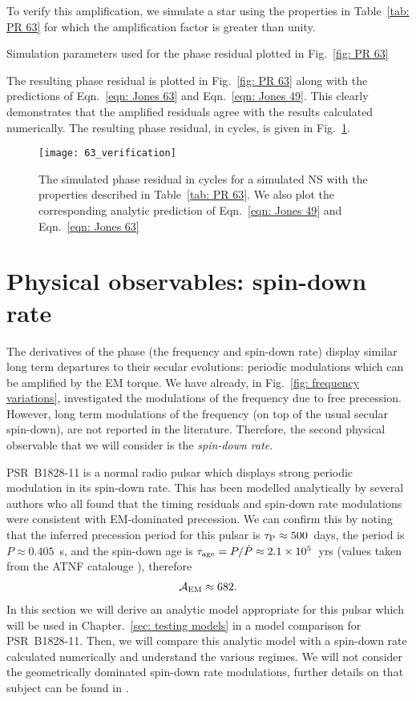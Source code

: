\documentclass[../full_thesis/full_thesis.tex]{subfiles}
\begin{document}
To verify this amplification, we simulate a star using the properties in
Table~\ref{tab: PR 63} for which the amplification factor is greater than
unity.
\begin{table}
\centering

\caption{Simulation parameters used for the phase residual plotted in Fig.~\ref{fig: PR 63}}
\label{tab: PR 63}
\end{table}
The resulting phase
residual is plotted in Fig.~\ref{fig: PR 63} along with the predictions of
Eqn.~\eqref{eqn: Jones 63} and Eqn.~\eqref{eqn: Jones 49}. This clearly demonstrates
that the amplified residuals agree with the results calculated
numerically.
The resulting phase residual, in cycles, is
given in Fig.~\ref{fig: PR 49}.
\begin{figure}[htb]
\centering
\texttt{[image: 63\_verification]}
\caption{The simulated phase residual in cycles for a simulated NS with the
properties described in Table~\ref{tab: PR 63}. We also plot the corresponding
analytic prediction of Eqn.~\eqref{eqn: Jones 49} and Eqn.~\eqref{eqn: Jones 63}}
\label{fig: PR 49}
\end{figure}

\section{Physical observables: spin-down rate}

The derivatives of the phase (the frequency and spin-down rate) display similar
long term departures to their secular evolutions: periodic modulations which
can be amplified by the EM torque.  We have already, in Fig.~\ref{fig:
frequency variations}, investigated the modulations of the frequency due to
free precession. However, long term modulations of the frequency (on top of the
usual secular spin-down), are not reported in the literature. Therefore, the
second physical observable that we will consider is the \emph{spin-down rate}.

PSR~B1828-11 is a normal radio pulsar which displays strong periodic modulation
in its spin-down rate. This has been modelled analytically by several authors
\citep{Stairs2000, Jones2001, Link2001, Akgun2006} who all found that the timing
residuals and spin-down rate modulations were consistent with EM-dominated
precession. We can confirm this by noting that the inferred precession period for this
pulsar is $\tau_{\mathrm{P}} \approx 500$~days, the period is $P\approx0.405$~s, and
the spin-down age is $\tau_{\mathrm{age}} = P/\dot{P} \approx 2.1 \times10^{5}$~yrs (values
taken from the ATNF catalouge \citet{ATNF}), therefore
\begin{align}
\mathcal{A}_{\mathrm{EM}} \approx 682.
\end{align}
In this section we will derive an analytic model appropriate for this pulsar
which will be used in Chapter.~\ref{sec: testing models} in a model comparison
for PSR~B1828-11. Then, we will compare this analytic model with a spin-down
rate calculated numerically and understand the various regimes. We will not
consider the geometrically dominated spin-down rate modulations, further
details on that subject can be found in \citet{Jones2001}.
\end{document}
